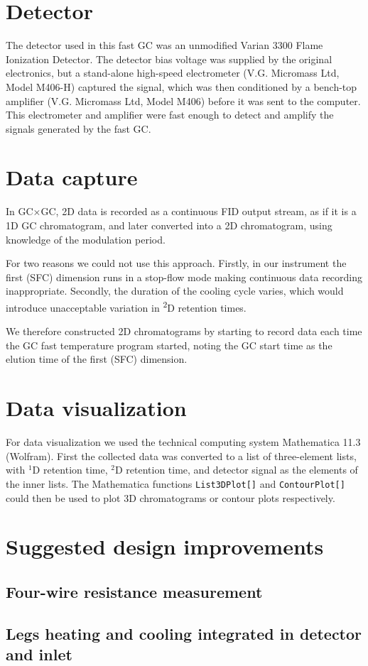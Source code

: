 \section{Detector}

The detector used in this fast GC was an unmodified Varian\texttrademark{} 3300
Flame Ionization Detector. The detector bias voltage was supplied by the
original electronics, but a stand-alone high-speed electrometer (V.G. Micromass
Ltd, Model M406-H) captured the signal, which was then conditioned by a
bench-top amplifier (V.G. Micromass Ltd, Model M406) before it was sent to the
computer. This electrometer and amplifier were fast enough to detect and amplify
the signals generated by the fast GC.

\section{Data capture}

In GC×GC, 2D data is recorded as a continuous FID output stream, as if it
is a 1D GC chromatogram, and later converted into a 2D chromatogram, using
knowledge of the modulation period.

For two reasons we could not use this approach. Firstly, in our instrument the
first (SFC) dimension runs in a stop-flow mode making continuous data recording
inappropriate. Secondly, the duration of the cooling cycle varies, which would
introduce unacceptable variation in \textsuperscript{2}D retention times.

We therefore constructed 2D chromatograms by starting to record data each time
the GC fast temperature program started, noting the GC start time as the elution
time of the first (SFC) dimension.

\section{Data visualization}
For data visualization we used the technical computing system Mathematica
11.3\texttrademark{} (Wolfram).  First the collected data was converted to a
list of three-element lists, with $^1$D retention time, $^2$D retention time,
and detector signal as the elements of the inner lists. The Mathematica
functions \texttt{List3DPlot[]} and \texttt{ContourPlot[]} could then be used to
plot 3D chromatograms or contour plots respectively.

\section{Suggested design improvements}

\subsection{Four-wire resistance measurement}
\subsection{Legs heating and cooling integrated in detector and inlet}
\subsection{}

\todos


